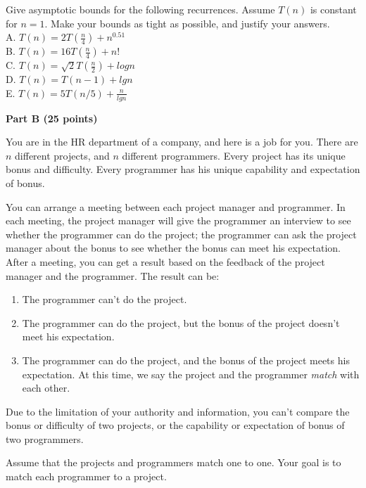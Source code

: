 \documentclass{article}
\begin{document}
\noindent Give asymptotic bounds for the following recurrences. Assume
$T(n)$ is constant for $n = 1$. Make your bounds as tight as possible,
and justify your answers.\\

\noindent A. $T(n) = 2T(\frac{n}{4}) + n^{0.51}$\\
\noindent B. $T(n) = 16 T(\frac{n}{4}) + n!$\\
\noindent C. $T(n) = \sqrt{2} T(\frac{n}{2}) + logn$\\
\noindent D. $T(n) = T(n-1) + lgn$\\
\noindent E. $T(n) = 5T(n/5) + \frac{n}{lgn}$\\

\begin{center}
{\bf Part B (25 points)}
\end{center}

 You are in the HR department of a company,
and here is a job for you.  There are $n$ different projects, and $n$
different programmers.  Every project has its unique bonus and
difficulty.  Every programmer has his unique capability and
expectation of bonus.

You can arrange a meeting between each project manager and programmer.
In each meeting, the project manager will give the programmer an
interview to see whether the programmer can do the project; the
programmer can ask the project manager about the bonus to see whether
the bonus can meet his expectation.  After a meeting, you can get a
result based on the feedback of the project manager and the
programmer.  The result can be:

\begin{enumerate}
  \item The programmer can't do the project.
  \item The programmer can do the project, but the bonus of the
    project doesn't meet his expectation.
  \item The programmer can do the project, and the bonus of the
    project meets his expectation. At this time, we say the project
    and the programmer \textit{match} with each other.
\end{enumerate}

Due to the limitation of your authority and information, you can't
compare the bonus or difficulty of two projects, or the capability or
expectation of bonus of two programmers.

Assume that the projects and programmers match one to one. Your goal
is to match each programmer to a project.
\end{document}
